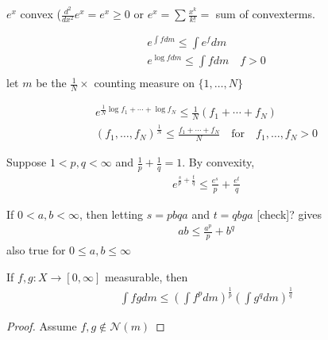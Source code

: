 \begin{example}
	$e^{x}$ convex
	($\frac{d^{2}}{dx^{2}} e^{x} = e^{x} \geq 0$ or $e^{x} = \sum \frac{x^{k}}{k!} =$ sum of convexterms.
\end{example}

\begin{align*}
	e^{\int f dm} \leq \int e^{f} dm \\
	e^{\log f dm} \leq \int f dm \quad f > 0 \\ 
\end{align*} let $m$ be the $\frac{1}{N} \times$ counting measure on $\{1, \ldots, N \}$ 

\begin{align*}
	e^{\frac{1}{N} \log f_{1} + \cdots + \log f_{N}} \leq \frac{1}{N} (f_{1} + \cdots + f_{N} ) \\
	(f_{1}, \ldots, f_{N})^{\frac{1}{N}} \leq \frac{f_{1} + \cdots + f_{N}}{N} \quad \text{for} \quad f_{1}, \ldots, f_{N} > 0
\end{align*} 

\begin{theorem}
	Suppose $1 < p,q < \infty$ and $\frac{1}{p} + \frac{1}{q} = 1$.
	By convexity,
	\begin{align*}
		e^{\frac{s}{p} + \frac{t}{q}} \leq \frac{e^{s}}{p} + \frac{e^{t}}{q}
	\end{align*} 
\end{theorem}

\begin{remark}
	If $0 < a,b < \infty$, then letting $s = pbqa$ and $t = qbga$ [check]?
	gives
	\begin{align*}
		ab \leq \frac{a^{p}}{p} + b^{q}
	\end{align*} also true for $0 \leq a,b \leq \infty$
\end{remark}

\begin{theorem}[Holder]
	If $f,g: X \to [0,\infty]$ measurable, then 
	 \begin{align*}
		\int fg dm \leq \left( \int f^{p} dm\right)^{\frac{1}{p}} \left( \int g^{q} dm\right)^{\frac{1}{q}}
	\end{align*} 
\end{theorem}

\begin{proof}
	Assume $f,g \notin \mathscr{N}(m)$
\end{proof}


